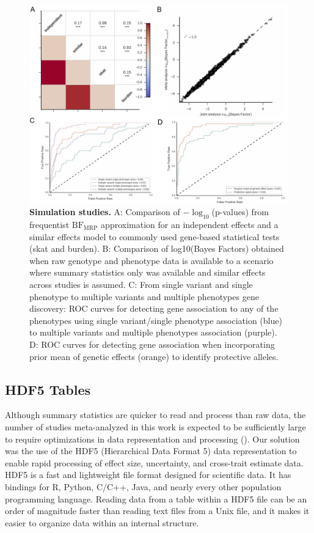 \begin{figure}[!h]
\includegraphics[width=\textwidth]{../figures/Figure_02.pdf}
\caption{{\bf Simulation studies.}
A: Comparison of $-\log_{10}$(p-values) from frequentist $\textrm{BF}_{\textrm{MRP}}$ approximation for an independent effects and a similar effects model to commonly used gene-based statistical tests (skat and burden). B: Comparison of log10(Bayes Factors) obtained when raw genotype and phenotype data is available to a scenario where summary statistics only was available and similar effects across studies is assumed. C: From single variant and single phenotype to multiple variants and multiple phenotypes gene discovery: ROC curves for detecting gene association to any of the phenotypes using single variant/single phenotype association (blue) to multiple variants and multiple phenotypes association (purple). D: ROC curves for detecting gene association when incorporating prior mean of genetic effects (orange) to identify protective alleles.}
\label{simresults}
\end{figure}

\subsection*{HDF5 Tables}
Although summary statistics are quicker to read and process than raw data, the number of studies meta-analyzed in this work is expected to be sufficiently large to require optimizations in data representation and processing (). Our solution was the use of the HDF5 (Hierarchical Data Format 5) data representation to enable rapid processing of effect size, uncertainty, and cross-trait estimate data. HDF5 is a fast and lightweight file format designed for scientific data. It has bindings for R, Python, C/C++, Java, and nearly every other population programming language. Reading data from a table within a HDF5 file can be an order of magnitude faster than reading text files from a Unix file, and it makes it easier to organize data within an internal structure.


